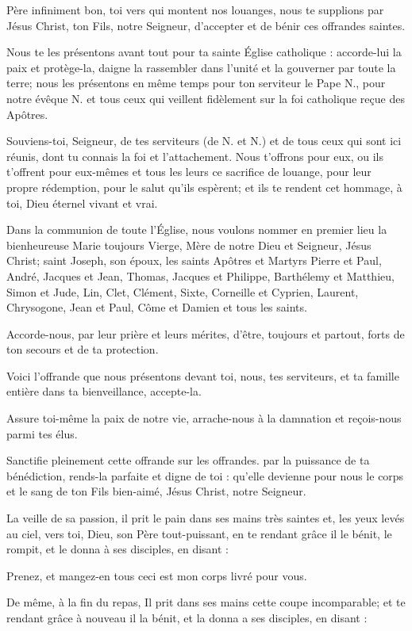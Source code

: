 Père infiniment bon, toi vers qui montent nos louanges, nous te supplions par Jésus Christ, ton Fils, notre Seigneur, d'accepter et de bénir ces offrandes saintes.

Nous te les présentons avant tout pour ta sainte Église catholique : accorde-lui la paix et protège-la, daigne la rassembler dans l'unité et la gouverner par toute la terre; nous les présentons en même temps pour ton serviteur le Pape N., pour notre évêque N. et tous ceux qui veillent fidèlement sur la foi catholique reçue des Apôtres.

Souviens-toi, Seigneur, de tes serviteurs (de N. et N.) et de tous ceux qui sont ici réunis, dont tu connais la foi et l'attachement. Nous t'offrons pour eux, ou ils t'offrent pour eux-mêmes et tous les leurs ce sacrifice de louange, pour leur propre rédemption, pour le salut qu'ils espèrent; et ils te rendent cet hommage, à toi, Dieu éternel vivant et vrai.

Dans la communion de toute l'Église, nous voulons nommer en premier lieu la bienheureuse Marie toujours Vierge, Mère de notre Dieu et Seigneur, Jésus Christ; saint Joseph, son époux, les saints Apôtres et Martyrs Pierre et Paul, André, Jacques et Jean, Thomas, Jacques et Philippe, Barthélemy et Matthieu, Simon et Jude, Lin, Clet, Clément, Sixte, Corneille et Cyprien, Laurent, Chrysogone, Jean et Paul, Côme et Damien et tous les saints.

Accorde-nous, par leur prière et leurs mérites, d'être, toujours et partout, forts de ton secours et de ta protection.

Voici l'offrande que nous présentons devant toi, nous, tes serviteurs, et ta famille entière dans ta bienveillance, accepte-la.

Assure toi-même la paix de notre vie, arrache-nous à la damnation et reçois-nous parmi tes élus.

Sanctifie pleinement cette offrande sur les offrandes. par la puissance de ta bénédiction, rends-la parfaite et digne de toi : qu'elle devienne pour nous le corps et le sang de ton Fils bien-aimé, Jésus Christ, notre Seigneur.

La veille de sa passion, il prit le pain dans ses mains très saintes et, les yeux levés au ciel, vers toi, Dieu, son Père tout-puissant, en te rendant grâce il le bénit, le rompit, et le donna à ses disciples, en disant :

Prenez, et mangez-en tous ceci est mon corps livré pour vous.

De même, à la fin du repas, Il prit dans ses mains cette coupe incomparable; et te rendant grâce à nouveau il la bénit, et la donna a ses disciples, en disant :

